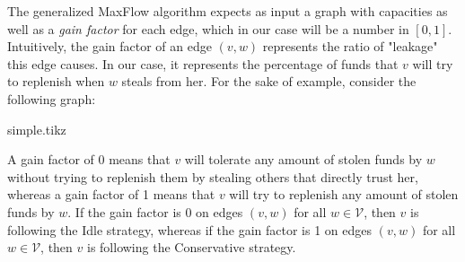 The generalized MaxFlow algorithm expects as input a graph with capacities as well as a \textit{gain factor} for each edge,
which in our case will be a number in $\left[0, 1\right]$. Intuitively, the gain factor of an edge $\left(v, w\right)$
represents the ratio of "leakage" this edge causes. In our case, it represents the percentage of funds that $v$ will try to
replenish when $w$ steals from her. For the sake of example, consider the following graph:

{simple.tikz}

A gain factor of 0 means that $v$ will tolerate any amount of stolen funds by $w$ without trying to replenish them by stealing
others that directly trust her, whereas a gain factor of 1 means that $v$ will try to replenish any amount of stolen funds by
$w$. If the gain factor is 0 on edges $\left(v, w\right)$ for all $w \in \mathcal{V}$, then $v$ is following the Idle
strategy, whereas if the gain factor is 1 on edges $\left(v, w\right)$ for all $w \in \mathcal{V}$, then $v$ is following the
Conservative strategy.
